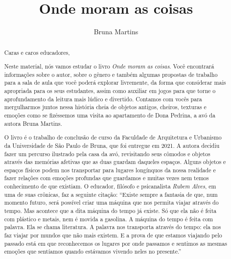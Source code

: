 \documentclass[11pt]{extarticle}
\newcommand{\AutorLivro}{Bruna Martins}
\newcommand{\TituloLivro}{Onde moram as coisas}
\newcommand{\colaborador}{Gabriela Karam}
\begin{document}
\title{\TituloLivro}
\author{\AutorLivro}
\def\authornotes{\colaborador}

\date{}
\maketitle


\tableofcontents


\begin{abstract}
Caras e caros educadores,

Neste material, nós vamos estudar o livro \textit{Onde moram as coisas}. Você encontrará informações sobre o autor, sobre o gênero e também algumas propostas de trabalho para a sala de aula que você poderá explorar livremente, da forma que considerar mais apropriada para os seus estudantes, assim como auxiliar em jogos para que torne o aprofundamento da leitura mais lúdico e divertido. Contamos com vocês para mergulharmos juntos nessa história cheia de objetos antigos, cheiros, texturas e emoções como se fizéssemos uma visita ao apartamento de Dona Pedrina, a avó da autora Bruna Martins. 

O livro é o trabalho de conclusão de curso da Faculdade de Arquitetura e Urbanismo da Universidade de São Paulo de Bruna, que foi entregue em 2021. A autora decidiu fazer um percurso ilustrado pela casa da avó, revisitando seus cômodos e objetos através das memórias afetivas que as duas guardam daqueles espaços. Alguns objetos e espaços físicos podem nos transportar para lugares longínquos da nossa realidade e fazer relações com emoções profundas que guardamos e muitas vezes nem temos conhecimento de que existiam. O educador, filósofo e psicanalista \textit{Rubem Alves}, em uma de suas crônicas, faz a seguinte citação:
``Existe sempre a fantasia de que, num momento futuro, será possível criar uma máquina que nos permita viajar através do tempo. Mas acontece que a dita máquina do tempo já existe. Só que ela não é feita com plástico e metais, nem é movida a gasolina. A máquina do tempo é feita com palavra. Ela se chama literatura. A palavra nos transporta através do tempo: ela nos faz viajar por mundos que não mais existem. E a prova de que estamos viajando pelo passado está em que reconhecemos os lugares por onde passamos e sentimos as mesmas emoções que sentíamos quando estávamos vivendo neles no presente.''


\end{abstract}
\end{document}

